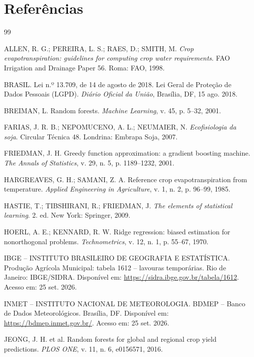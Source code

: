 \documentclass[12pt]{article}
\begin{document}
\section*{Referências}

\begin{thebibliography}{99}

ALLEN, R. G.; PEREIRA, L. S.; RAES, D.; SMITH, M. \emph{Crop
evapotranspiration: guidelines for computing crop water requirements}. FAO
Irrigation and Drainage Paper 56. Roma: FAO, 1998.

BRASIL. Lei n.º 13.709, de 14 de agosto de 2018. Lei Geral de Proteção de
Dados Pessoais (LGPD). \emph{Diário Oficial da União}, Brasília, DF, 15 ago.
2018.

BREIMAN, L. Random forests. \emph{Machine Learning}, v. 45, p. 5--32, 2001.

FARIAS, J. R. B.; NEPOMUCENO, A. L.; NEUMAIER, N. \emph{Ecofisiologia da
soja}. Circular Técnica 48. Londrina: Embrapa Soja, 2007.

FRIEDMAN, J. H. Greedy function approximation: a gradient boosting machine.
\emph{The Annals of Statistics}, v. 29, n. 5, p. 1189--1232, 2001.

HARGREAVES, G. H.; SAMANI, Z. A. Reference crop evapotranspiration from
temperature. \emph{Applied Engineering in Agriculture}, v. 1, n. 2, p.
96--99, 1985.

HASTIE, T.; TIBSHIRANI, R.; FRIEDMAN, J. \emph{The elements of statistical
learning}. 2. ed. New York: Springer, 2009.

HOERL, A. E.; KENNARD, R. W. Ridge regression: biased estimation for
nonorthogonal problems. \emph{Technometrics}, v. 12, n. 1, p. 55--67, 1970.

IBGE -- INSTITUTO BRASILEIRO DE GEOGRAFIA E ESTATÍSTICA. Produção Agrícola
Municipal: tabela 1612 -- lavouras temporárias. Rio de Janeiro: IBGE/SIDRA.
Disponível em: \url{https://sidra.ibge.gov.br/tabela/1612}. Acesso em: 25
set. 2026.

INMET -- INSTITUTO NACIONAL DE METEOROLOGIA. BDMEP -- Banco de Dados
Meteorológicos. Brasília, DF. Disponível em:
\url{https://bdmep.inmet.gov.br/}. Acesso em: 25 set. 2026.

JEONG, J. H. et al. Random forests for global and regional crop yield
predictions. \emph{PLOS ONE}, v. 11, n. 6, e0156571, 2016.


\end{thebibliography}
\end{document}

